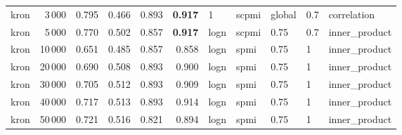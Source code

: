 \begin{tabular}{lrrrrrlllll}
    kron &            3\,000 &  0.795 &  0.466 &      0.893 &          \textbf{0.917} &     1 &  scpmi &  global &  0.7 &    correlation \\
    kron &            5\,000 &  0.770 &  0.502 &      0.857 &          \textbf{0.917} &  logn &  scpmi &    0.75 &  0.7 &  inner\_product \\
    kron &           10\,000 &  0.651 &  0.485 &      0.857 &          0.858 &  logn &   spmi &    0.75 &    1 &  inner\_product \\
    kron &           20\,000 &  0.690 &  0.508 &      0.893 &          0.900 &  logn &   spmi &    0.75 &    1 &  inner\_product \\
    kron &           30\,000 &  0.705 &  0.512 &      0.893 &          0.909 &  logn &   spmi &    0.75 &    1 &  inner\_product \\
    kron &           40\,000 &  0.717 &  0.513 &      0.893 &          0.914 &  logn &   spmi &    0.75 &    1 &  inner\_product \\
    kron &           50\,000 &  0.721 &  0.516 &      0.821 &          0.894 &  logn &   spmi &    0.75 &    1 &  inner\_product \\
\bottomrule
\end{tabular}
